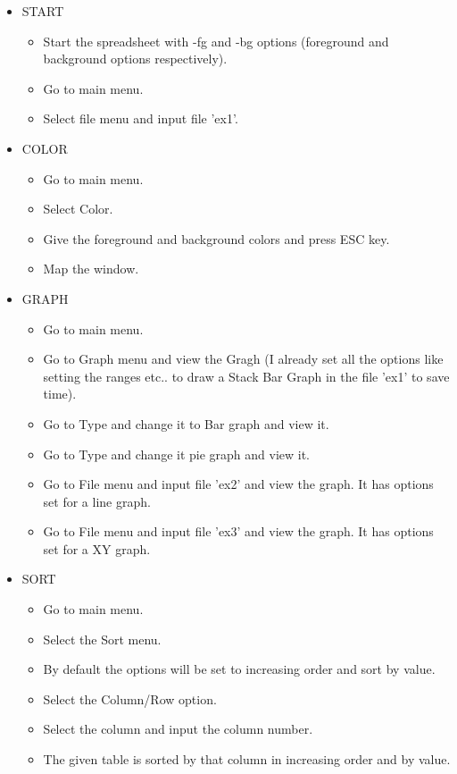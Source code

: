 \begin{itemize}
  \item START
   \begin{itemize}
    \item Start the spreadsheet with -fg and -bg options (foreground and background options respectively).
    \item Go to main menu.
    \item Select file menu and input file 'ex1'.
   \end{itemize}
  \item COLOR
   \begin{itemize}
    \item Go to main menu.
    \item Select Color.
    \item Give the foreground and background colors and press ESC key.
    \item Map the window.
   \end{itemize}
  \item GRAPH
   \begin{itemize}
    \item Go to main menu.
    \item Go to Graph menu and view the Gragh (I already set all the options like setting the ranges etc.. to draw a Stack Bar Graph in the file 'ex1' to save time).
    \item Go to Type and change it to Bar graph and view it.
    \item Go to Type and change it pie graph and view it.
    \item Go to File menu and input file 'ex2' and view the graph. It has options set for a line graph.
    \item Go to File menu and input file 'ex3' and view the graph. It has options set for a XY graph.
   \end{itemize}
  \item SORT
   \begin{itemize}
    \item Go to main menu.
    \item Select the Sort menu.
    \item By default the options will be set to increasing order and sort by value.
    \item Select the Column/Row option.
    \item Select the column and input the column number. 
    \item The given table is sorted by that column in increasing order and by value.

\end{itemize}
\end{itemize}
